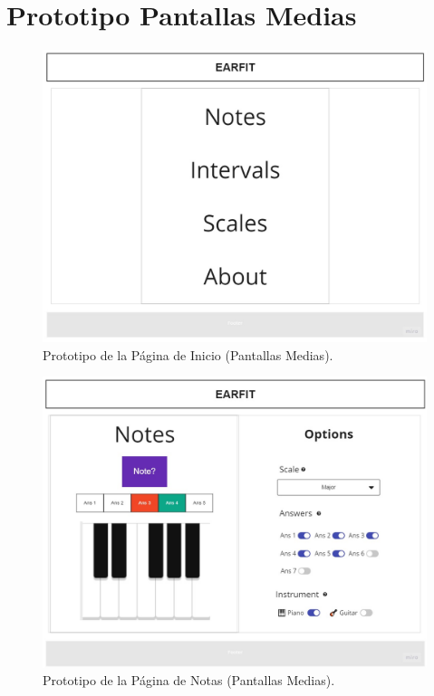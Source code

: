 \documentclass[12pt,twoside,titlepage]{report}
\begin{document}
{\section{Prototipo Pantallas Medias}

\begin{figure}[H]
    \centering
    \includegraphics[scale=0.3]{Design Thinking/Prototipo/Medium/Menu}
    \caption{Prototipo de la Página de Inicio (Pantallas Medias).}
    \label{fig:Menu}
\end{figure}

\begin{figure}[H]
    \centering
    \includegraphics[scale=0.3]{Design Thinking/Prototipo/Medium/Notes}
    \caption{Prototipo de la Página de Notas (Pantallas Medias).}
    \label{fig:Notes}
\end{figure}

}
\end{document}
